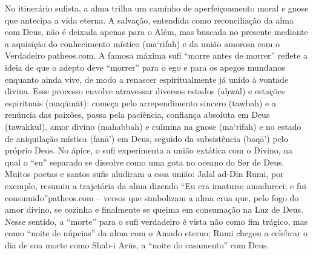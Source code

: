 No itinerário sufista, a alma trilha um caminho de aperfeiçoamento moral e gnose que antecipa a vida eterna. A salvação, entendida como reconciliação da alma com Deus, não é deixada apenas para o Além, mas buscada no presente mediante a aquisição do conhecimento místico (ma‘rifah) e da união amorosa com o Verdadeiro patheos.com. A famosa máxima sufi “morre antes de morrer” reflete a ideia de que o adepto deve “morrer” para o ego e para os apegos mundanos enquanto ainda vive, de modo a renascer espiritualmente já unido à vontade divina. Esse processo envolve atravessar diversos estados (a\d{h}wāl) e estações espirituais (maqāmāt): começa pelo arrependimento sincero (tawbah) e a renúncia das paixões, passa pela paciência, confiança absoluta em Deus (tawakkul), amor divino (mahabbah) e culmina na gnose (ma‘rifah) e no estado de aniquilação mística (fanā’) em Deus, seguido da subsistência (baqā’) pelo próprio Deus. No ápice, o sufi experimenta a união extática com o Divino, na qual o “eu” separado se dissolve como uma gota no oceano do Ser de Deus. Muitos poetas e santos sufis aludiram a essa união: Jalāl ad-Dīn Rumi, por exemplo, resumiu a trajetória da alma dizendo “Eu era imaturo; amadureci; e fui consumido”patheos.com -- versos que simbolizam a alma crua que, pelo fogo do amor divino, se cozinha e finalmente se queima em consumação na Luz de Deus. Nesse sentido, a “morte” para o sufi verdadeiro é vista não como fim trágico, mas como “noite de núpcias” da alma com o Amado eterno; Rumi chegou a celebrar o dia de sua morte como Shab-i Arūs, a “noite do casamento” com Deus.


